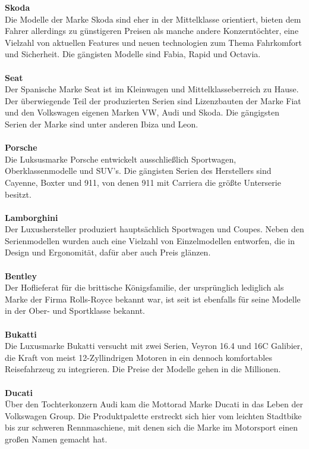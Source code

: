 \documentclass[12pt]{article}
\begin{document}
\textbf{Skoda}\\
Die Modelle der Marke Skoda sind eher in der Mittelklasse orientiert, bieten dem Fahrer allerdings zu günstigeren Preisen als manche andere Konzerntöchter, eine Vielzahl von aktuellen Features und neuen technologien zum Thema Fahrkomfort und Sicherheit.
Die gängisten Modelle sind Fabia, Rapid und Octavia.\\
\\
\textbf{Seat}\\
Der Spanische Marke Seat ist im Kleinwagen und Mittelklasseberreich zu Hause. Der überwiegende Teil der produzierten Serien sind Lizenzbauten der Marke Fiat und den Volkswagen eigenen Marken VW, Audi und Skoda.
Die gängigsten Serien der Marke sind unter anderen Ibiza und Leon.\\
\\ 
\textbf{Porsche}\\
Die Luksusmarke Porsche entwickelt ausschließlich Sportwagen, Oberklassenmodelle und SUV's.
Die gängisten Serien des Herstellers sind Cayenne, Boxter und 911, von denen 911 mit Carriera die größte Unterserie besitzt.\\
\\
\textbf{Lamborghini}\\
Der Luxushersteller produziert hauptsächlich Sportwagen und Coupes. Neben den Serienmodellen wurden auch eine
Vielzahl von Einzelmodellen entworfen, die in Design und Ergonomität, dafür aber auch Preis glänzen.\\
\\
\textbf{Bentley}\\
Der Hoflieferat für die brittische Königsfamilie, der ursprünglich lediglich als Marke der Firma Rolls-Royce bekannt war, ist seit  ist ebenfalls für seine Modelle in der Ober- und Sportklasse bekannt.\\
\\
\textbf{Bukatti}\\
Die Luxusmarke Bukatti versucht mit zwei Serien, Veyron 16.4 und 16C Galibier, die Kraft von meist 12-Zyllindrigen Motoren in ein dennoch komfortables Reisefahrzeug zu integrieren. Die Preise der Modelle gehen in die Millionen.\\
\\
\textbf{Ducati}\\
Über den Tochterkonzern Audi kam die Mottorad Marke Ducati in das Leben der Volkswagen Group. Die Produktpalette erstreckt sich hier vom leichten Stadtbike bis zur schweren Rennmaschiene, mit denen sich die Marke im Motorsport einen großen Namen gemacht hat.\\
\end{document}
